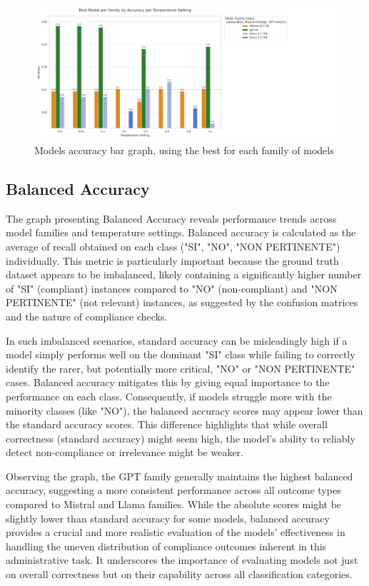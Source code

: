 \documentclass[../main.tex]{subfiles}
\begin{document}
\begin{figure}[H]
    \caption{Models accuracy bar graph, using the best for each family of models}
    \label{fig:Accuracy_Best}
    \includegraphics[width=\textwidth]{Graphs/Best_Accuracy.png}
\end{figure}


\subsection{Balanced Accuracy}
The graph presenting Balanced Accuracy reveals performance trends across model families and temperature settings. Balanced accuracy is calculated as the average of recall obtained on each class ("SI", "NO", "NON PERTINENTE") individually. This metric is particularly important because the ground truth dataset appears to be imbalanced, likely containing a significantly higher number of "SI" (compliant) instances compared to "NO" (non-compliant) and "NON PERTINENTE" (not relevant) instances, as suggested by the confusion matrices and the nature of compliance checks.

In such imbalanced scenarios, standard accuracy can be misleadingly high if a model simply performs well on the dominant "SI" class while failing to correctly identify the rarer, but potentially more critical, "NO" or "NON PERTINENTE" cases. Balanced accuracy mitigates this by giving equal importance to the performance on each class. Consequently, if models struggle more with the minority classes (like "NO"), the balanced accuracy scores may appear lower than the standard accuracy scores. This difference highlights that while overall correctness (standard accuracy) might seem high, the model's ability to reliably detect non-compliance or irrelevance might be weaker.

Observing the graph, the GPT family generally maintains the highest balanced accuracy, suggesting a more consistent performance across all outcome types compared to Mistral and Llama families. While the absolute scores might be slightly lower than standard accuracy for some models, balanced accuracy provides a crucial and more realistic evaluation of the models' effectiveness in handling the uneven distribution of compliance outcomes inherent in this administrative task. It underscores the importance of evaluating models not just on overall correctness but on their capability across all classification categories.
\end{document}
